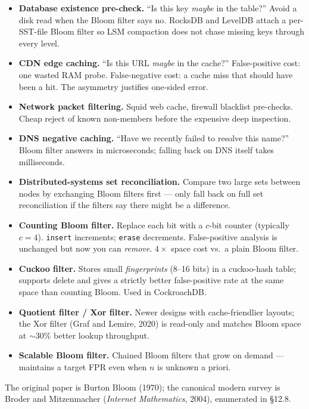 \documentclass[11pt]{article}
\begin{document}
\begin{itemize}[leftmargin=*]
    \item \textbf{Database existence pre-check.} ``Is this key
          \emph{maybe} in the table?'' Avoid a disk read when the
          Bloom filter says no. RocksDB and LevelDB attach a
          per-SST-file Bloom filter so LSM compaction does not
          chase missing keys through every level.
    \item \textbf{CDN edge caching.} ``Is this URL \emph{maybe}
          in the cache?'' False-positive cost: one wasted RAM
          probe. False-negative cost: a cache miss that should
          have been a hit. The asymmetry justifies one-sided
          error.
    \item \textbf{Network packet filtering.} Squid web cache,
          firewall blacklist pre-checks. Cheap reject of known
          non-members before the expensive deep inspection.
    \item \textbf{DNS negative caching.} ``Have we recently failed
          to resolve this name?'' Bloom filter answers in
          microseconds; falling back on DNS itself takes
          milliseconds.
    \item \textbf{Distributed-systems set reconciliation.} Compare
          two large sets between nodes by exchanging Bloom
          filters first --- only fall back on full set
          reconciliation if the filters say there might be a
          difference.
\end{itemize}

\begin{notebox}
\begin{itemize}[leftmargin=*]
    \item \textbf{Counting Bloom filter.} Replace each bit with a
          $c$-bit counter (typically $c=4$). \texttt{insert}
          increments; \texttt{erase} decrements. False-positive
          analysis is unchanged but now you can \emph{remove}.
          $4\times$ space cost vs.\ a plain Bloom filter.
    \item \textbf{Cuckoo filter.} Stores small \emph{fingerprints}
          (8--16 bits) in a cuckoo-hash table; supports delete and
          gives a strictly better false-positive rate at the same
          space than counting Bloom. Used in CockroachDB.
    \item \textbf{Quotient filter / Xor filter.} Newer designs
          with cache-friendlier layouts; the Xor filter (Graf and
          Lemire, 2020) is read-only and matches Bloom space at
          $\sim 30\%$ better lookup throughput.
    \item \textbf{Scalable Bloom filter.} Chained Bloom filters
          that grow on demand --- maintains a target FPR even
          when $n$ is unknown a priori.
\end{itemize}
The original paper is Burton Bloom (1970); the canonical modern
survey is Broder and Mitzenmacher (\emph{Internet Mathematics},
2004), enumerated in \S12.8.
\end{notebox}
\end{document}
